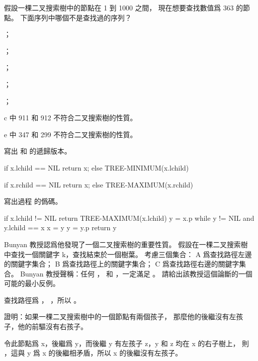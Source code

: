 \startsection[
  title={Querying a binary search tree},
]

\startEXERCISE
假設一棵二叉搜索樹中的節點在 1 到 1000 之間，
現在想要查找數值爲 363 的節點。
下面序列中哪個不是查找過的序列？
\startigBase[a]
\item {}；
\item {}；
\item {}；
\item {}；
\item {}；
\stopigBase
\stopEXERCISE

\startANSWER
c 中 911 和 912 不符合二叉搜索樹的性質。

e 中 347 和 299 不符合二叉搜索樹的性質。
\stopANSWER

\startEXERCISE
寫出  和  的遞歸版本。
\stopEXERCISE

\startANSWER
{}
\startCLRS
if x.lchild == NIL
	return x;
else
	TREE-MINIMUM(x.lchild)
\stopCLRS

\startCLRS
if x.rchild == NIL
	return x;
else
	TREE-MAXIMUM(x.rchild)
\stopCLRS
\stopANSWER

\startEXERCISE
寫出過程  的僞碼。
\stopEXERCISE

\startANSWER
{}
\startCLRS
if x.lchild != NIL
	return TREE-MAXIMUM(x.lchild)
y = x.p
while y != NIL and y.lchild == x
	x = y
	y = y.p
return y
\stopCLRS
\stopANSWER

\startEXERCISE
Bunyan 教授認爲他發現了一個二叉搜索樹的重要性質。
假設在一棵二叉搜索樹中查找一個關鍵字 k，查找結束於一個樹葉。
考慮三個集合： A 爲查找路徑左邊的關鍵字集合；
 B 爲查找路徑上的關鍵字集合； C 爲查找路徑右邊的關鍵字集合。
 Bunyan 教授聲稱：任何 ，  和 ，一定滿足 。
請給出該教授這個論斷的一個可能的最小反例。
\stopEXERCISE

\startANSWER
\externalfigure[output/e12_2_4-1]
查找路徑爲 ， ，所以 。
\stopANSWER

\startEXERCISE
證明：如果一棵二叉搜索樹中的一個節點有兩個孩子，
那麼他的後繼沒有左孩子，他的前驅沒有右孩子。
\stopEXERCISE

\startANSWER
令此節點爲 x，後繼爲 y，而後繼 y 有左孩子 z，y 和 z 均在 x 的右子樹上，
則 ，這與 y 爲 x 的後繼相矛盾，所以 x 的後繼沒有左孩子。

